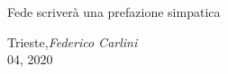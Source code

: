 %
%
%

\preface

Fede scriverà una prefazione simpatica


\vspace{1cm}
\begin{flushright}\noindent
Trieste,\hfill {\it Federico Carlini}\\
04, 2020\hfill\\
\end{flushright}


